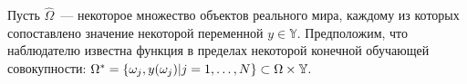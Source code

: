 Пусть $\hat \Omega$~--- некоторое  множество объектов реального мира, каждому из которых сопоставлено значение некоторой переменной $y\in \mathbb Y.$ 
Предположим, что наблюдателю известна функция в пределах некоторой конечной обучающей совокупности: $\Omega^* = \left\{\omega_j, y(\omega_j) | j = 1,\ldots, N\right\} \subset \Omega \times \mathbb Y.$